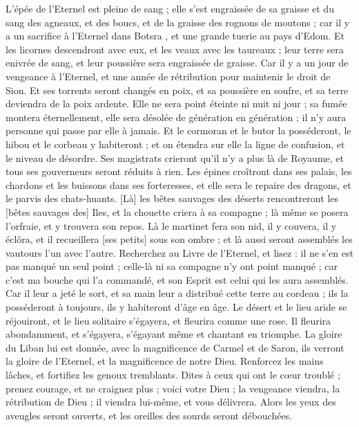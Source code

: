 \begin{multicols}{2}
L'épée de l'Eternel est pleine de sang ; elle s'est engraissée de sa graisse et du sang des agneaux, et des boucs, et de la graisse des rognons de moutons ; car il y a un sacrifice à l'Eternel dans Botsra , et une grande tuerie au pays d'Edom.
Et les licornes descendront avec eux, et les veaux avec les taureaux ; leur terre sera enivrée de sang, et leur poussière sera engraissée de graisse.
Car il y a un jour de vengeance à l'Eternel, et une année de rétribution pour maintenir le droit de Sion.
Et ses torrents seront changés en poix, et sa poussière en soufre, et sa terre deviendra de la poix ardente.
Elle ne sera point éteinte ni nuit ni jour ; sa fumée montera éternellement, elle sera désolée de génération en génération ; il n'y aura personne qui passe par elle à jamais.
Et le cormoran et le butor la posséderont, le hibou et le corbeau y habiteront ; et on étendra sur elle la ligne de confusion, et le niveau de désordre.
Ses magistrats crieront qu'il n'y a plus là de Royaume, et tous ses gouverneurs seront réduits à rien.
Les épines croîtront dans ses palais, les chardons et les buissons dans ses forteresses, et elle sera le repaire des dragons, et le parvis des chats-huants.
[Là] les bêtes sauvages des déserts rencontreront les [bêtes sauvages des] Iles, et la chouette criera à sa compagne ; là même se posera l'orfraie, et y trouvera son repos.
Là le martinet fera son nid, il y couvera, il y éclôra, et il recueillera [ses petits] sous son ombre ; et là aussi seront assemblés les vautours l'un avec l'autre.
Recherchez au Livre de l'Eternel, et lisez : il ne s'en est pas manqué un seul point ; celle-là ni sa compagne n'y ont point manqué ; car c'est ma bouche qui l'a commandé, et son Esprit est celui qui les aura assemblés.
Car il leur a jeté le sort, et sa main leur a distribué cette terre au cordeau ; ils la posséderont à toujours, ils y habiteront d'âge en âge.
\VerseOne{}Le désert et le lieu aride se réjouiront, et le lieu solitaire s'égayera, et fleurira comme une rose.
Il fleurira abondamment, et s'égayera, s'égayant même et chantant en triomphe. La gloire du Liban lui est donnée, avec la magnificence de Carmel et de Saron, ils verront la gloire de l'Eternel, et la magnificence de notre Dieu.
Renforcez les mains lâches, et fortifiez les genoux tremblants.
Dites à ceux qui ont le cœur troublé ; prenez courage, et ne craignez plus ; voici votre Dieu ; la vengeance viendra, la rétribution de Dieu ; il viendra lui-même, et vous délivrera.
Alors les yeux des aveugles seront ouverts, et les oreilles des sourds seront débouchées.

\end{multicols}
